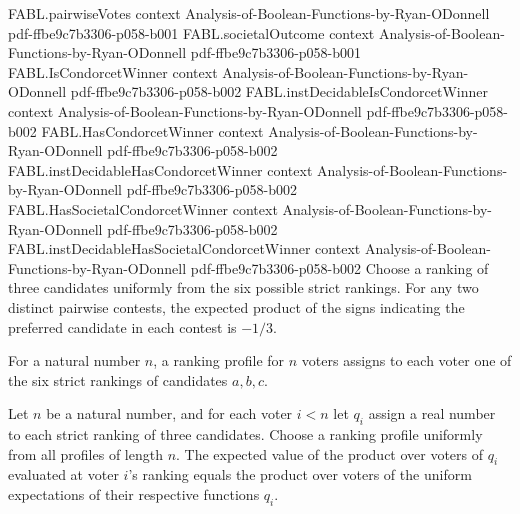 \begin{theorem}
\proofstep
  {FABL.pairwiseVotes}
  {context}
  {Analysis-of-Boolean-Functions-by-Ryan-ODonnell}
  {pdf-ffbe9c7b3306-p058-b001}
\proofstep
  {FABL.societalOutcome}
  {context}
  {Analysis-of-Boolean-Functions-by-Ryan-ODonnell}
  {pdf-ffbe9c7b3306-p058-b001}
\proofstep
  {FABL.IsCondorcetWinner}
  {context}
  {Analysis-of-Boolean-Functions-by-Ryan-ODonnell}
  {pdf-ffbe9c7b3306-p058-b002}
\proofstep
  {FABL.instDecidableIsCondorcetWinner}
  {context}
  {Analysis-of-Boolean-Functions-by-Ryan-ODonnell}
  {pdf-ffbe9c7b3306-p058-b002}
\proofstep
  {FABL.HasCondorcetWinner}
  {context}
  {Analysis-of-Boolean-Functions-by-Ryan-ODonnell}
  {pdf-ffbe9c7b3306-p058-b002}
\proofstep
  {FABL.instDecidableHasCondorcetWinner}
  {context}
  {Analysis-of-Boolean-Functions-by-Ryan-ODonnell}
  {pdf-ffbe9c7b3306-p058-b002}
\proofstep
  {FABL.HasSocietalCondorcetWinner}
  {context}
  {Analysis-of-Boolean-Functions-by-Ryan-ODonnell}
  {pdf-ffbe9c7b3306-p058-b002}
\proofstep
  {FABL.instDecidableHasSocietalCondorcetWinner}
  {context}
  {Analysis-of-Boolean-Functions-by-Ryan-ODonnell}
  {pdf-ffbe9c7b3306-p058-b002}
Choose a ranking of three candidates uniformly from the six possible strict rankings.
For any two distinct pairwise contests, the expected product of the signs indicating the
preferred candidate in each contest is $-1/3$.
\end{theorem}

\begin{definition}
\label{FABL.RankingProfile}
\leanok
{}
For a natural number $n$, a ranking profile for $n$ voters assigns to each voter one of
the six strict rankings of candidates $a,b,c$.
\end{definition}

\begin{theorem}
\label{FABL.expect_rankingProfile_prod}
\leanok
{}
Let $n$ be a natural number, and for each voter $i<n$ let $q_i$ assign a real number to
each strict ranking of three candidates. Choose a ranking profile uniformly from all
profiles of length $n$. The expected value of the product over voters of $q_i$ evaluated
at voter $i$'s ranking equals the product over voters of the uniform expectations of
their respective functions $q_i$.
\end{theorem}

